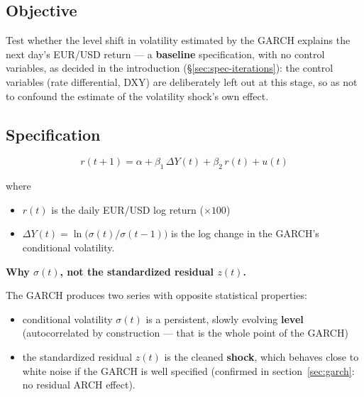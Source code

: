 \documentclass[12pt,a4paper]{article}
\begin{document}
\subsection{Objective}

Test whether the level shift in volatility estimated by the GARCH
explains the next day's EUR/USD return --- a \textbf{baseline}
specification, with no control variables, as decided in the
introduction (\S\ref{sec:spec-iterations}): the control variables
(rate differential, DXY) are deliberately left out at this stage, so as
not to confound the estimate of the volatility shock's own effect.

\subsection{Specification}


\begin{center}
	\begin{keyeq}
		\begin{equation}
			r(t+1) = \alpha + \beta_1 \, \Delta Y(t) + \beta_2 \, r(t) + u(t)
		\end{equation}
	\end{keyeq}
\end{center}		

\vspace{0.8cm}

where 
\begin{itemize}
	\item $r(t)$ is the daily EUR/USD log return ($\times 100$)
	\item $\Delta Y(t) = \ln\!\big(\sigma(t)/\sigma(t-1)\big)$ is the log change in the GARCH's conditional volatility.
\end{itemize}

\vspace{0.8cm} 

\textbf{Why $\sigma(t)$, not the standardized residual $z(t)$.} 

The GARCH produces two series with opposite statistical properties: 
\begin{itemize}
	\item conditional volatility $\sigma(t)$ is a persistent, slowly evolving \textbf{level} (autocorrelated by construction --- that is the whole point
	of the GARCH)~ 
	\item the standardized residual $z(t)$ is the cleaned \textbf{shock}, which behaves close to white noise if the GARCH is well specified
	(confirmed in section~\ref{sec:garch}: no residual ARCH effect).
\end{itemize}
\end{document}
